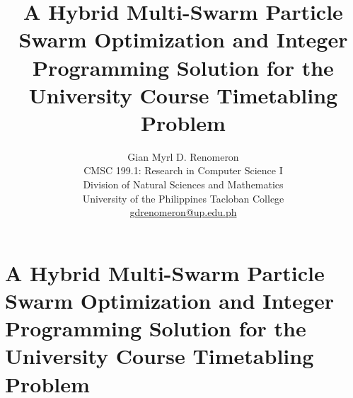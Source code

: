 \documentclass{article}
\begin{document}
\title{\textbf{A Hybrid Multi-Swarm Particle Swarm Optimization and Integer Programming Solution for the University Course Timetabling Problem}}
\author{Gian Myrl D. Renomeron\\
    CMSC 199.1: Research in Computer Science I\\
    Division of Natural Sciences and Mathematics\\
    University of the Philippines Tacloban College\\
    {\small \href{mailto:gdrenomeron@up.edu.ph}{gdrenomeron@up.edu.ph}}
}
\date{}

\maketitle
\pagebreak
    \section*{A Hybrid Multi-Swarm Particle Swarm Optimization and Integer Programming Solution for the University Course Timetabling Problem}
\end{document}

